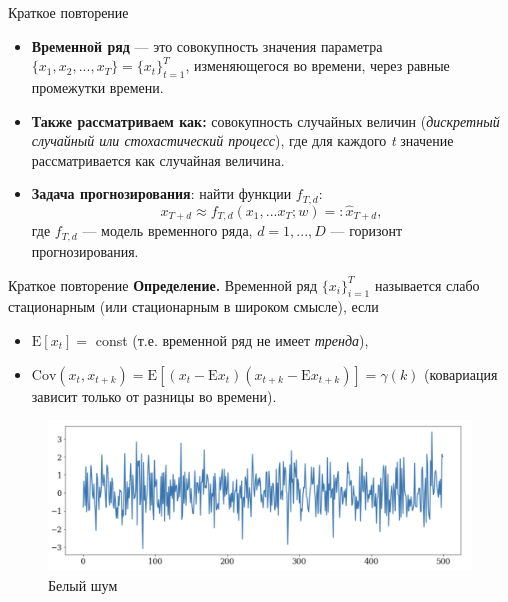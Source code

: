 
\usepackage{tikz}
\usepackage{amsmath}
\usepackage[english,russian]{babel}
\usepackage[labelformat=empty]{caption}

\usetikzlibrary{arrows,shapes,positioning,shadows,trees}
\newcommand*{\defeq}{\stackrel{\text{def}}{=}}


\begin{frame}
\titlepage
\end{frame}
\begin{frame}{Краткое повторение}
\begin{itemize}
\item \textbf{Временной ряд} --- это совокупность значения параметра $\{x_1, x_2,...,x_T\}= \{ x_t \}_{t=1}^T$, изменяющегося во времени,  через равные промежутки времени.
\item \textbf{Также рассматриваем как:} совокупность случайных величин (\textit{дискретный случайный или стохастический процесс}), где для каждого \textit{t} значение рассматривается как случайная величина.
\item \textbf{Задача прогнозирования}: найти функции $f_{T,d}$:
\begin{equation*}
x_{T+d} \approx f_{T,d}(x_1,...x_T;w) =: \hat{x}_{T+d}, 
\end {equation*}
где $f_{T,d}$ --- модель временного ряда, $d =1,...,D$ --- горизонт прогнозирования.
\end{itemize}

\end{frame}
\begin{frame}{Краткое повторение}
\textbf{Определение.} Временной ряд $\{x_i\}_{i=1}^{T}$ называется слабо стационарным (или стационарным в широком смысле), если
\begin{itemize}
    \item $\mathrm{E}[x_t]=$ const (т.е. временной ряд не имеет \textit{тренда}),
    \item $\mathrm{Cov}(x_t,x_{t+k}) = \mathrm{E}[(x_t - \mathrm{E}x_t)(x_{t+k} - \mathrm{E}x_{t+k})] = \gamma(k)$ (ковариация зависит только от разницы во времени).
\end{itemize}
\begin{figure}
    \centering
    \includegraphics[width=0.9\linewidth]{lecture_3/fig/noise.png}
    \caption{Белый шум}
\end{figure}
\end{frame}

